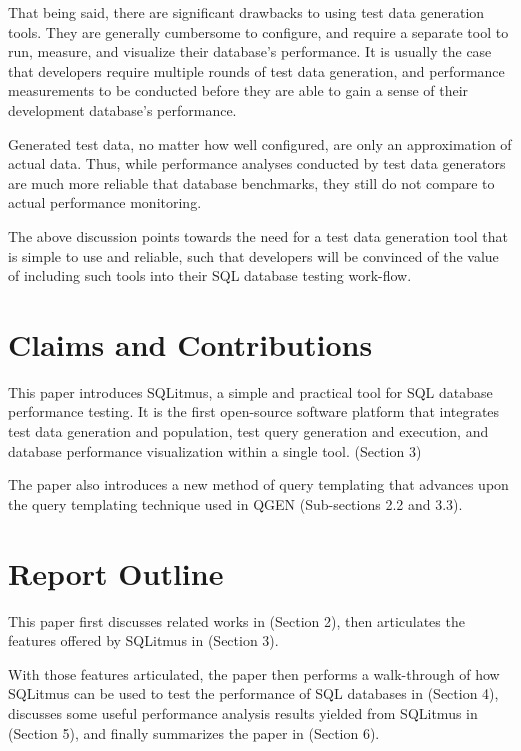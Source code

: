 \documentclass[12pt]{report}
\begin{document}
\begin{spacing}{1.9}
		That being said, there are significant drawbacks to using test data generation tools. They are generally cumbersome to configure, and require a separate tool to run, measure, and visualize their database’s performance. It is usually the case that developers require multiple rounds of test data generation, and performance measurements to be conducted before they are able to gain a sense of their development database’s performance. 
		
		Generated test data, no matter how well configured, are only an approximation of actual data. Thus, while performance analyses conducted by test data generators are much more reliable that database benchmarks, they still do not compare to actual performance monitoring.
		
		The above discussion points towards the need for a test data generation tool that is simple to use and reliable, such that developers will be convinced of the value of including such tools into their SQL database testing work-flow.
		
		
		
		
		\section{Claims and Contributions}
		This paper introduces SQLitmus, a simple and practical tool for SQL database performance testing. It is the first open-source software platform that integrates test data generation and population, test query generation and execution, and database performance visualization within a single tool. (Section 3)
		
		The paper also introduces a new method of query templating that advances upon the query templating technique used in QGEN\cite{Poess:2004} (Sub-sections 2.2 and 3.3).
		
		
		\section{Report Outline}
		
		This paper first discusses related works in (Section 2), then articulates the features offered by SQLitmus in (Section 3).
		
		With those features articulated, the paper then performs a walk-through of how SQLitmus can be used to test the performance of SQL databases in (Section 4), discusses some useful performance analysis results yielded from SQLitmus in (Section 5), and finally summarizes the paper in (Section 6).
		

\end{spacing}
\end{document}
